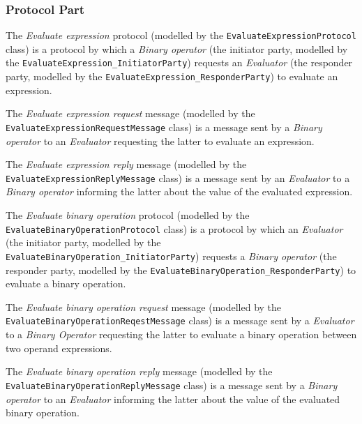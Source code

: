 \subsubsection*{Protocol Part}

The \textit{Evaluate expression} protocol (modelled by the \texttt{EvaluateExpressionProtocol} class) is a protocol by which a \textit{Binary operator} (the initiator party, modelled by the \texttt{EvaluateExpression\_InitiatorParty}) requests an \textit{Evaluator} (the responder party, modelled by the \texttt{EvaluateExpression\_ResponderParty}) to evaluate an expression.

The \textit{Evaluate expression request} message (modelled by the \texttt{EvaluateExpressionRequestMessage} class) is a message sent by a \textit{Binary operator} to an \textit{Evaluator} requesting the latter to evaluate an expression.

The \textit{Evaluate expression reply} message (modelled by the \texttt{EvaluateExpressionReplyMessage} class) is a message sent by an \textit{Evaluator} to a \textit{Binary operator} informing the latter about the value of the evaluated expression.

The \textit{Evaluate binary operation} protocol (modelled by the \texttt{EvaluateBinaryOperationProtocol} class) is a protocol by which an \textit{Evaluator} (the initiator party, modelled by the \texttt{EvaluateBinaryOperation\_InitiatorParty}) requests a \textit{Binary operator} (the responder party, modelled by the \texttt{EvaluateBinaryOperation\_ResponderParty}) to evaluate a binary operation.

The \textit{Evaluate binary operation request} message (modelled by the \texttt{EvaluateBinaryOperationReqestMessage} class) is a message sent by a \textit{Evaluator} to a \textit{Binary Operator} requesting the latter to evaluate a binary operation between two operand expressions.

The \textit{Evaluate binary operation reply} message (modelled by the \texttt{EvaluateBinaryOperationReplyMessage} class) is a message sent by a \textit{Binary operator} to an \textit{Evaluator} informing the latter about the value of the evaluated binary operation.

